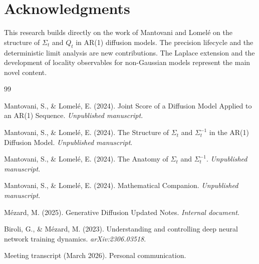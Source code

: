 \documentclass[11pt,a4paper]{article}
\theoremstyle{plain}
\theoremstyle{definition}
\begin{document}
\section*{Acknowledgments}

This research builds directly on the work of Mantovani and Lomelé on the structure of $\Sigma_t$ and $Q_t$ in AR(1) diffusion models. The precision lifecycle and the deterministic limit analysis are new contributions. The Laplace extension and the development of locality observables for non-Gaussian models represent the main novel content.

\begin{thebibliography}{99}

 Mantovani, S., \& Lomelé, E. (2024). Joint Score of a Diffusion Model Applied to an AR(1) Sequence. \emph{Unpublished manuscript}.

 Mantovani, S., \& Lomelé, E. (2024). The Structure of $\Sigma_t$ and $\Sigma_t^{-1}$ in the AR(1) Diffusion Model. \emph{Unpublished manuscript}.

 Mantovani, S., \& Lomelé, E. (2024). The Anatomy of $\Sigma_t$ and $\Sigma_t^{-1}$. \emph{Unpublished manuscript}.

 Mantovani, S., \& Lomelé, E. (2024). Mathematical Companion. \emph{Unpublished manuscript}.

 Mézard, M. (2025). Generative Diffusion Updated Notes. \emph{Internal document}.

 Biroli, G., \& Mézard, M. (2023). Understanding and controlling deep neural network training dynamics. \emph{arXiv:2306.03518}.

 Meeting transcript (March 2026). Personal communication.

\end{thebibliography}
\end{document}

